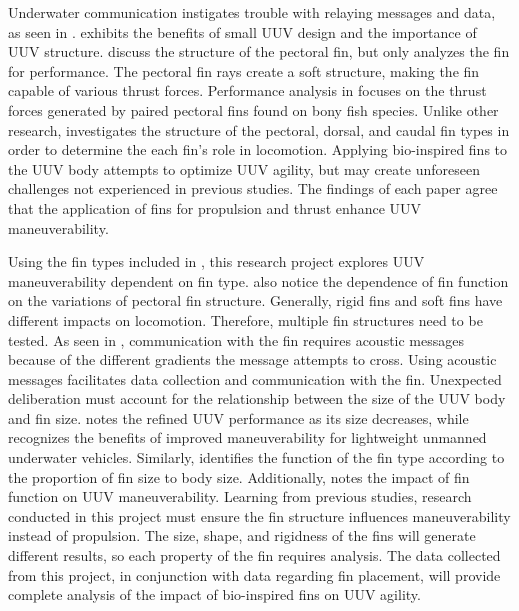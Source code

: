 \documentclass{IEEEtran}
\begin{document}
Underwater communication instigates trouble with relaying messages and data, as seen in \cite{hiller2012expanding, xu2007initial}.  \cite{hiller2012expanding} exhibits the benefits of small UUV design and the importance of UUV structure.  \cite{geder2013maneuvering, tangorra2006biorobotic, westneat2004structure, lauder2004morphology} discuss the structure of the pectoral fin, but only \cite{westneat2004structure} analyzes the fin for performance.  The pectoral fin rays create a soft structure, making the fin capable of various thrust forces.  Performance analysis in \cite{westneat2004structure} focuses on the thrust forces generated by paired pectoral fins found on bony fish species.  Unlike other research, \cite{lauder2004morphology} investigates the structure of the pectoral, dorsal, and caudal fin types in order to determine the each fin’s role in locomotion.  Applying bio-inspired fins to the UUV body attempts to optimize UUV agility, but may create unforeseen challenges not experienced in previous studies.  The findings of each paper agree that the application of fins for propulsion and thrust enhance UUV maneuverability.  

Using the fin types included in \cite{lauder2004morphology}, this research project explores UUV maneuverability dependent on fin type.  \cite{westneat2004structure, lauder2004morphology} also notice the dependence of fin function on the variations of pectoral fin structure.  Generally, rigid fins and soft fins have different impacts on locomotion.  Therefore, multiple fin structures need to be tested.  As seen in \cite{xu2007initial}, communication with the fin requires acoustic messages because of the different gradients the message attempts to cross.  Using acoustic messages facilitates data collection and communication with the fin.  Unexpected deliberation must account for the relationship between the size of the UUV body and fin size.  \cite{hiller2012expanding} notes the refined UUV performance as its size decreases, while \cite{xu2007initial} recognizes the benefits of improved maneuverability for lightweight unmanned underwater vehicles.  Similarly, \cite{lauder2004morphology} identifies the function of the fin type according to the proportion of fin size to body size.  Additionally, \cite{lauder2004morphology} notes the impact of fin function on UUV maneuverability.  Learning from previous studies, research conducted in this project must ensure the fin structure influences maneuverability instead of propulsion.  The size, shape, and rigidness of the fins will generate different results, so each property of the fin requires analysis.  The data collected from this project, in conjunction with data regarding fin placement, will provide complete analysis of the impact of bio-inspired fins on UUV agility.     
\end{document}
